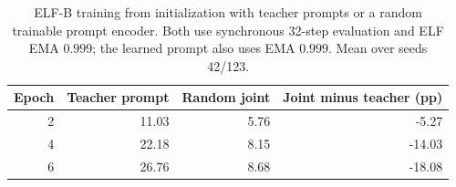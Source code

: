 \begin{table}[t]
\caption{ELF-B training from initialization with teacher prompts or a random trainable prompt encoder. Both use synchronous 32-step evaluation and ELF EMA $0.999$; the learned prompt also uses EMA $0.999$. Mean over seeds 42/123.}
\label{tab:randomjoint}
\centering\small
\begin{tabular}{rrrr}
\toprule
Epoch & Teacher prompt & Random joint & Joint minus teacher (pp) \\
\midrule
2 & 11.03 & 5.76 & -5.27 \\
4 & 22.18 & 8.15 & -14.03 \\
6 & 26.76 & 8.68 & -18.08 \\
\bottomrule
\end{tabular}
\end{table}
